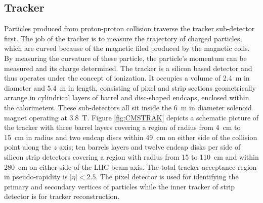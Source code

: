 \subsection{Tracker}
Particles produced from proton-proton collision traverse the tracker sub-detector first. The job of the tracker is to measure the trajectory of charged particles, which are curved because of the magnetic filed produced by the magnetic coils. By measuring the curvature of these particle, the particle's momentum can be measured and its charge determined. The tracker is a silicon based detector and thus operates under the concept of ionization. It occupies a volume of 2.4~m in diameter and 5.4~m in length, consisting of pixel and strip sections geometrically arrange in cylindrical layers of barrel and disc-shaped endcaps, enclosed within the calorimeters. These sub-detectors all sit inside the 6~m in diameter solenoid magnet operating at 3.8~T. Figure \eqref{fig:CMSTRAK} depicts a schematic picture of the tracker with three barrel layers covering a region of radius from 4~cm to 15~cm in radius and two endcap discs within 49~cm on either side of the collision point along the $z$ axis; ten barrels layers  and twelve endcap disks per side of silicon strip detectors covering a region with radius from 15 to 110~cm and within 280~cm on either side of the LHC beam axis. The total tracker acceptance region in pseudo-rapidity is $|\eta| < 2.5$. The pixel detector is used for identifying the primary and secondary vertices of particles while the inner tracker of strip detector is for tracker reconstruction. 
